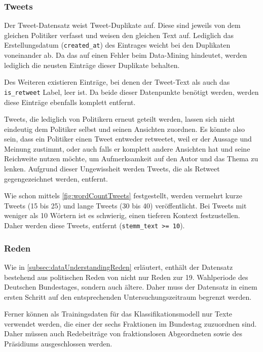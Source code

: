 \subsubsection*{Tweets} \label{subsubsec:filteringTweets}


Der Tweet-Datensatz \textcite{saltzer_finding_2022} weist Tweet-Duplikate auf. Diese sind jeweils von dem gleichen Politiker verfasst und weisen den gleichen Text auf. Lediglich das Erstellungsdatum (\texttt{created\_at}) des Eintrages weicht bei den Duplikaten voneinander ab. Da das auf einen Fehler beim Data-Mining hindeutet, werden lediglich die neusten Einträge dieser Duplikate behalten.

Des Weiteren existieren Einträge, bei denen der Tweet-Text als auch das \texttt{is\_retweet} Label, leer ist. Da beide dieser Datenpunkte benötigt werden, werden diese Einträge ebenfalls komplett entfernt. 

Tweets, die lediglich von Politikern erneut geteilt werden, lassen sich nicht eindeutig dem Politiker selbst und seinen Ansichten zuordnen. Es könnte also sein, dass ein Politiker einen Tweet entweder retweetet, weil er der Aussage und Meinung zustimmt, oder auch falls er komplett andere Ansichten hat und seine Reichweite nutzen möchte, um Aufmerksamkeit auf den Autor und das Thema zu lenken. Aufgrund dieser Ungewissheit werden Tweets, die als Retweet gegengezeichnet werden, entfernt.

Wie schon mittels \autoref{fig:wordCountTweets} festgestellt, werden vermehrt kurze Tweets (\num{15} bis \num{25}) und lange Tweets (\num{30} bis \num{40}) veröffentlicht. Bei Tweets mit weniger als \num{10} Wörtern ist es schwierig, einen tieferen Kontext festzustellen. Daher werden diese Tweets, entfernt (\texttt{stemm\_text >= 10}).

\subsubsection*{Reden}

Wie in \autoref{subsec:dataUnderstandingReden} erläutert, enthält der Datensatz bestehend aus politischen Reden von \citeauthor{richter_open_2021} nicht nur Reden zur 19. Wahlperiode des Deutschen Bundestages, sondern auch ältere. Daher muss der Datensatz in einem ersten Schritt auf den entsprechenden Untersuchungszeitraum begrenzt werden.

Ferner können als Trainingsdaten für das Klassifikationsmodell nur Texte verwendet werden, die einer der sechs Fraktionen im Bundestag zuzuordnen sind. Daher müssen auch Redebeiträge von fraktionslosen Abgeordneten sowie des Präsidiums ausgeschlossen werden.

